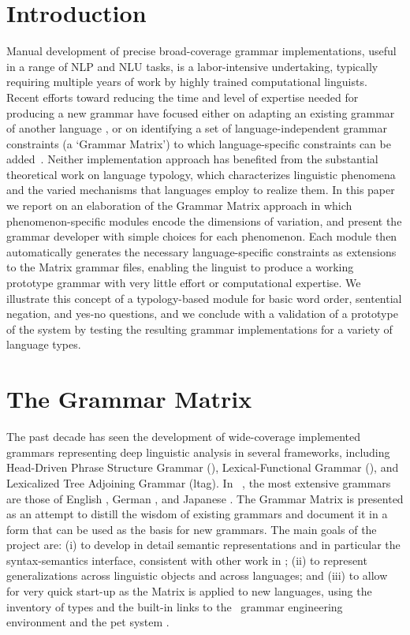 \section{Introduction}
Manual development of precise broad-coverage grammar implementations,
useful in a range of NLP and NLU tasks, 
is a labor-intensive undertaking, typically requiring multiple years
of work by highly trained computational linguists.  Recent
efforts toward reducing the time and level of expertise
needed for producing a new grammar have focused either on adapting an
existing grammar of another language
\cite{Butt-et-al-02,Kim:Dal:Kap:Kin:Mas:Ohk:03,Bat:Kru:Kru:ta}, or on
identifying a set of language-independent grammar constraints (a `Grammar
Matrix') to which
language-specific constraints can be added~\cite{Ben:Fli:Oe:02}.
Neither implementation approach has benefited from the substantial
theoretical work on language typology, which characterizes linguistic
phenomena and the varied mechanisms that languages employ to realize
them.  In this paper we report on an elaboration of the Grammar Matrix
approach in which phenomenon-specific modules encode the dimensions of
variation, and present the grammar developer with simple choices 
for each phenomenon. Each module then
automatically generates the necessary language-specific constraints as
extensions to the Matrix grammar files, enabling the linguist to
produce a working prototype grammar with very little effort or
computational expertise.  We illustrate this concept of a
typology-based module for basic word order, sentential negation, and
yes-no questions, and we conclude with a validation of a prototype of
the system by testing the resulting grammar implementations for a variety
of language types.

\section{The Grammar Matrix}

The past decade has seen the development of wide-coverage implemented
grammars representing deep linguistic analysis in
several frameworks, including Head-Driven Phrase Structure Grammar
(\hpsg), Lexical-Functional Grammar (\lfg), and Lexicalized Tree
Adjoining Grammar ({\sc ltag}). In \hpsg\ \cite{Pol:Sag:94}, the most
extensive grammars are those of English \cite{Flickinger:00}, German
\cite{Hinrichs:etal:97,Mue:Kap:00,Crysmannip}, and Japanese \cite{Siegel:00,Siegel:Bender:02}.
The Grammar Matrix \cite{Ben:Fli:Oe:02} is presented as 
an attempt to distill the
wisdom of existing grammars and document it in a form that can
be used as the basis for new grammars. The main goals of the project
are: (i) to develop in detail semantic representations and in particular 
the syntax-semantics interface, consistent with other work in \hpsg; 
(ii) to represent generalizations across linguistic objects
and across languages; and (iii) to allow for very quick start-up as 
the Matrix is applied to new languages, using the inventory of types and
the built-in links to the \lkb\ grammar engineering environment
\cite{Copestake:02} and the {\sc pet} system \cite{Callmeier:00}.

